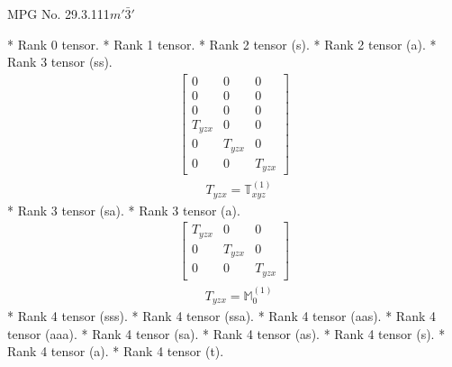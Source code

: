 \documentclass[fleqn,8pt,landscape]{jsarticle}
\begin{document}
\setcounter{MaxMatrixCols}{32}

\renewcommand{\tablename}{Table~}
\renewcommand{\figurename}{Figure~}
\begin{center}
\LARGE
MPG No. 29.3.111\quad$m'\bar{3}'$
\end{center}
* Rank 0 tensor.
* Rank 1 tensor.
* Rank 2 tensor (s).
* Rank 2 tensor (a).
* Rank 3 tensor (ss).
\begin{align*}
\begin{bmatrix} 0 & 0 & 0 \\ 0 & 0 & 0 \\ 0 & 0 & 0 \\ T_{yzx} & 0 & 0 \\ 0 & T_{yzx} & 0 \\ 0 & 0 & T_{yzx} \end{bmatrix}
\end{align*}
\begin{align*}
& T_{yzx} = \mathbb{T}_{xyz}^{(1)}
\end{align*}
* Rank 3 tensor (sa).
* Rank 3 tensor (a).
\begin{align*}
\begin{bmatrix} T_{yzx} & 0 & 0 \\ 0 & T_{yzx} & 0 \\ 0 & 0 & T_{yzx} \end{bmatrix}
\end{align*}
\begin{align*}
& T_{yzx} = \mathbb{M}_{0}^{(1)}
\end{align*}
* Rank 4 tensor (sss).
* Rank 4 tensor (ssa).
* Rank 4 tensor (aas).
* Rank 4 tensor (aaa).
* Rank 4 tensor (sa).
* Rank 4 tensor (as).
* Rank 4 tensor (s).
* Rank 4 tensor (a).
* Rank 4 tensor (t).
\end{document}
